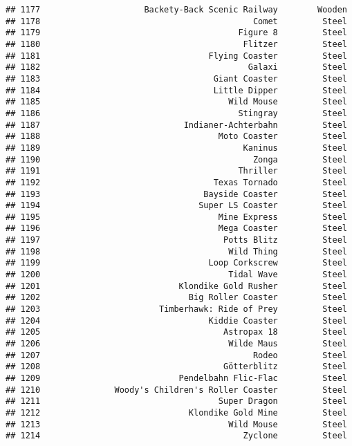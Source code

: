 \documentclass[
]{article}
\begin{document}
\begin{verbatim}
## 1177                     Backety-Back Scenic Railway        Wooden
## 1178                                           Comet         Steel
## 1179                                        Figure 8         Steel
## 1180                                         Flitzer         Steel
## 1181                                  Flying Coaster         Steel
## 1182                                          Galaxi         Steel
## 1183                                   Giant Coaster         Steel
## 1184                                   Little Dipper         Steel
## 1185                                      Wild Mouse         Steel
## 1186                                        Stingray         Steel
## 1187                             Indianer-Achterbahn         Steel
## 1188                                    Moto Coaster         Steel
## 1189                                         Kaninus         Steel
## 1190                                           Zonga         Steel
## 1191                                        Thriller         Steel
## 1192                                   Texas Tornado         Steel
## 1193                                 Bayside Coaster         Steel
## 1194                                Super LS Coaster         Steel
## 1195                                    Mine Express         Steel
## 1196                                    Mega Coaster         Steel
## 1197                                     Potts Blitz         Steel
## 1198                                      Wild Thing         Steel
## 1199                                  Loop Corkscrew         Steel
## 1200                                      Tidal Wave         Steel
## 1201                            Klondike Gold Rusher         Steel
## 1202                              Big Roller Coaster         Steel
## 1203                        Timberhawk: Ride of Prey         Steel
## 1204                                  Kiddie Coaster         Steel
## 1205                                     Astropax 18         Steel
## 1206                                      Wilde Maus         Steel
## 1207                                           Rodeo         Steel
## 1208                                     Götterblitz         Steel
## 1209                            Pendelbahn Flic-Flac         Steel
## 1210               Woody's Children's Roller Coaster         Steel
## 1211                                    Super Dragon         Steel
## 1212                              Klondike Gold Mine         Steel
## 1213                                      Wild Mouse         Steel
## 1214                                         Zyclone         Steel

\end{verbatim}
\end{document}
